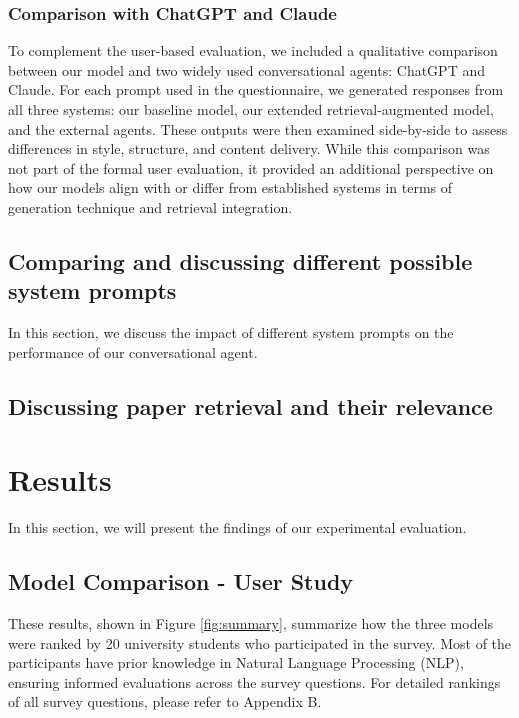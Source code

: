 \documentclass[fleqn,moreauthors,10pt]{ds_report}
\begin{document}
\subsubsection*{Comparison with ChatGPT and Claude}

To complement the user-based evaluation, we included a qualitative comparison between our model and two widely used conversational agents: ChatGPT and Claude. For each prompt used in the questionnaire, we generated responses from all three systems: our baseline model, our extended retrieval-augmented model, and the external agents. These outputs were then examined side-by-side to assess differences in style, structure, and content delivery. While this comparison was not part of the formal user evaluation, it provided an additional perspective on how our models align with or differ from established systems in terms of generation technique and retrieval integration.


\subsection*{Comparing and discussing different possible system prompts}
In this section, we discuss the impact of different system prompts on the performance of our conversational agent.

\subsection*{Discussing paper retrieval and their relevance}


\section*{Results}

In this section, we will present the findings of our experimental evaluation.

\subsection*{Model Comparison - User Study}

These results, shown in Figure \ref{fig:summary}, summarize how the three models were ranked by 20 university students who participated in the survey. Most of the participants have prior knowledge in Natural Language Processing (NLP), ensuring informed evaluations across the survey questions. For detailed rankings of all survey questions, please refer to Appendix B.
\end{document}
